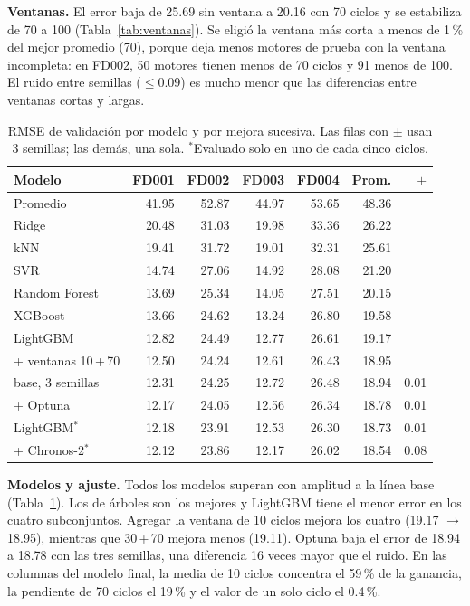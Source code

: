\documentclass[conference]{IEEEtran}
\begin{document}
\textbf{Ventanas.} El error baja de 25.69 sin ventana a 20.16 con 70 ciclos y se estabiliza de 70 a 100 (Tabla~\ref{tab:ventanas}). Se eligió la ventana más corta a menos de 1\,\% del mejor promedio (70), porque deja menos motores de prueba con la ventana incompleta: en FD002, 50 motores tienen menos de 70 ciclos y 91 menos de 100. El ruido entre semillas ($\le$0.09) es mucho menor que las diferencias entre ventanas cortas y largas.

\begin{table}[t]
\centering
\caption{RMSE de validación por modelo y por mejora sucesiva. Las filas con $\pm$ usan 3 semillas; las demás, una sola. $^{*}$Evaluado solo en uno de cada cinco ciclos.}
\label{tab:modelos}
\footnotesize
\setlength{\tabcolsep}{3pt}
\begin{tabular}{@{}lrrrrrr@{}}
\toprule
Modelo & FD001 & FD002 & FD003 & FD004 & Prom. & $\pm$ \\
\midrule
Promedio & 41.95 & 52.87 & 44.97 & 53.65 & 48.36 & \\
Ridge & 20.48 & 31.03 & 19.98 & 33.36 & 26.22 & \\
kNN & 19.41 & 31.72 & 19.01 & 32.31 & 25.61 & \\
SVR & 14.74 & 27.06 & 14.92 & 28.08 & 21.20 & \\
Random Forest & 13.69 & 25.34 & 14.05 & 27.51 & 20.15 & \\
XGBoost & 13.66 & 24.62 & 13.24 & 26.80 & 19.58 & \\
LightGBM & 12.82 & 24.49 & 12.77 & 26.61 & 19.17 & \\
\midrule
+ ventanas 10\,+\,70 & 12.50 & 24.24 & 12.61 & 26.43 & 18.95 & \\
\quad base, 3 semillas & 12.31 & 24.25 & 12.72 & 26.48 & 18.94 & 0.01 \\
+ Optuna & 12.17 & 24.05 & 12.56 & 26.34 & 18.78 & 0.01 \\
\midrule
LightGBM$^{*}$ & 12.18 & 23.91 & 12.53 & 26.30 & 18.73 & 0.01 \\
+ Chronos-2$^{*}$ & 12.12 & 23.86 & 12.17 & 26.02 & 18.54 & 0.08 \\
\bottomrule
\end{tabular}
\end{table}

\textbf{Modelos y ajuste.} Todos los modelos superan con amplitud a la línea base (Tabla~\ref{tab:modelos}). Los de árboles son los mejores y LightGBM tiene el menor error en los cuatro subconjuntos. Agregar la ventana de 10 ciclos mejora los cuatro (19.17 $\rightarrow$ 18.95), mientras que 30\,+\,70 mejora menos (19.11). Optuna baja el error de 18.94 a 18.78 con las tres semillas, una diferencia 16 veces mayor que el ruido. En las columnas del modelo final, la media de 10 ciclos concentra el 59\,\% de la ganancia, la pendiente de 70 ciclos el 19\,\% y el valor de un solo ciclo el 0.4\,\%.
\end{document}
